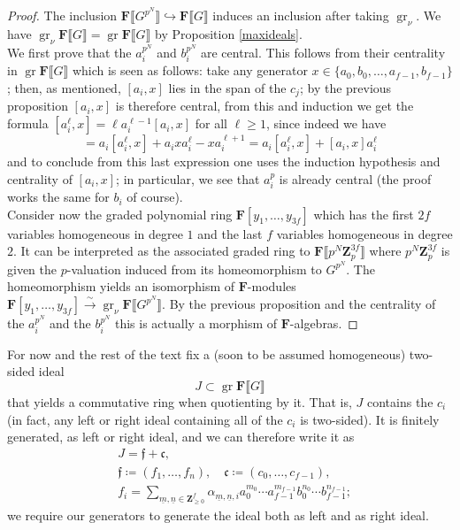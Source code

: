 \documentclass[11pt, oneside]{article}
\DeclareMathOperator{\gr}{gr}
\theoremstyle{definition}
\begin{document}
	\begin{proof}
		The inclusion $\mathbf F\llbracket G^{p^N}\rrbracket\hookrightarrow\mathbf F\llbracket G\rrbracket$ induces an inclusion after taking $\gr_\nu$. We have $\gr_\nu\mathbf F\llbracket G\rrbracket=\gr\mathbf F\llbracket G\rrbracket$ by Proposition \ref{maxideals}.\\
		We first prove that the $a_i^{p^N}$ and $b_i^{p^N}$ are central. This follows from their centrality in $\gr\mathbf F\llbracket G\rrbracket$ which is seen as follows: take any generator $x\in\{a_0,b_0,\dots,a_{f-1},b_{f-1}\}$; then, as mentioned, $[a_i,x]$ lies in the span of the $c_j$; by the previous proposition $[a_i,x]$ is therefore central, from this and induction we get the formula $[a_i^\ell,x]=\ell a_i^{\ell-1}[a_i,x]$ for all $\ell\geq1$, since indeed we have \begin{equation*}
			[a_i^{\ell+1},x]=a_i[a_i^\ell,x]+a_ixa_i^\ell-xa_i^{\ell+1}=a_i[a_i^\ell,x]+[a_i,x]a_i^\ell
		\end{equation*} and to conclude from this last expression one uses the induction hypothesis and centrality of $[a_i,x]$; in particular, we see that $a_i^p$ is already central (the proof works the same for $b_i$ of course).\\
		Consider now the graded polynomial ring $\mathbf F[y_1,\dots,y_{3f}]$ which has the first $2f$ variables homogeneous in degree $1$ and the last $f$ variables homogeneous in degree $2$. It can be interpreted as the associated graded ring to $\mathbf F\llbracket p^N\mathbf Z_p^{3f}\rrbracket$ where $p^N\mathbf Z_p^{3f}$ is given the $p$-valuation induced from its homeomorphism to $G^{p^N}$. The homeomorphism yields an isomorphism of $\mathbf F$-modules $\mathbf F[y_1,\dots,y_{3f}]\xrightarrow{\sim}\gr_\nu\mathbf F\llbracket G^{p^N}\rrbracket$. By the previous proposition and the centrality of the $a_i^{p^N}$ and the $b_i^{p^N}$ this is actually a morphism of $\mathbf F$-algebras.
	\end{proof}
	For now and the rest of the text fix a (soon to be assumed homogeneous) two-sided ideal $$J\subset\gr\mathbf F\llbracket G\rrbracket$$ that yields a commutative ring when quotienting by it. That is, $J$ contains the $c_i$ (in fact, any left or right ideal containing all of the $c_i$ is two-sided). It is finitely generated, as left or right ideal, and we can therefore write it as \begin{equation*}\label{J}
		\begin{aligned}
			&J=\mathfrak f+\mathfrak c,\\
			&\mathfrak f\coloneqq(f_1,\dots,f_n),\quad\mathfrak c\coloneqq(c_0,\dots,c_{f-1}),\\
			&f_i=\sum_{\underline m,\underline n\in\mathbf Z_{\geq0}^f}\alpha_{\underline m,\underline n,i}a_0^{m_0}\cdots a_{f-1}^{m_{f-1}}b_0^{n_0}\cdots b_{f-1}^{n_{f-1}};
		\end{aligned}
	\end{equation*} we require our generators to generate the ideal both as left and as right ideal.
\end{document}
